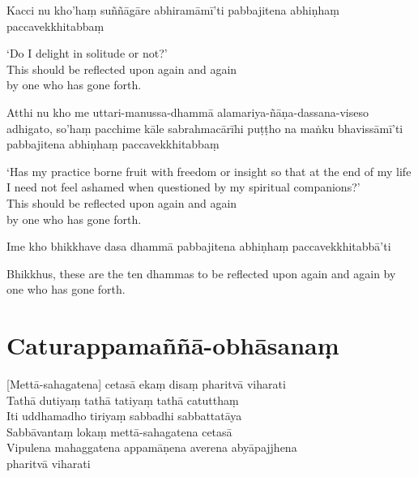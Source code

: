 Kacci nu kho'haṃ suññāgāre abhiramāmī'ti pabbajitena abhiṇhaṃ paccavekkhitabbaṃ

\begin{english}
  `Do I delight in solitude or not?'\\
  This should be reflected upon again and again\\
  by one who has gone forth.
\end{english}

Atthi nu kho me uttari-manussa-dhammā alamariya-ñāṇa-dassana-viseso adhigato, so'haṃ pacchime kāle sabrahmacārīhi puṭṭho na maṅku bhavissāmī'ti pabbajitena abhiṇhaṃ paccavekkhitabbaṃ

\begin{english}
  `Has my practice borne fruit with freedom or insight so that at the end of my life I need not feel ashamed when questioned by my spiritual companions?'\\
  This should be reflected upon again and again\\
  by one who has gone forth.
\end{english}

Ime kho bhikkhave dasa dhammā pabbajitena abhiṇhaṃ paccavekkhitabbā'ti

\begin{english}
  Bhikkhus, these are the ten dhammas to be reflected upon again and again by one who has gone forth.
\end{english}


\section{Caturappamaññā-obhāsanaṃ}


\begin{leader}
\end{leader}

[Mettā-sahagatena] cetasā ekaṃ disaṃ pharitvā viharati\\
Tathā dutiyaṃ tathā tatiyaṃ tathā catutthaṃ\\
Iti uddhamadho tiriyaṃ sabbadhi sabbattatāya\\
Sabbāvantaṃ lokaṃ mettā-sahagatena cetasā\\
Vipulena mahaggatena appamāṇena averena abyāpajjhena\\
\vin pharitvā viharati

